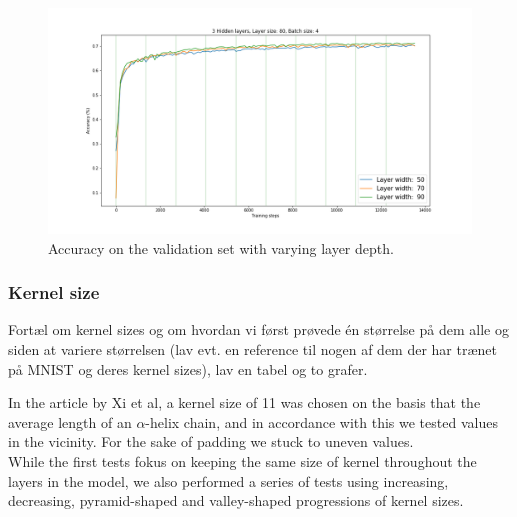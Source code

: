 \begin{figure}[H]
  \centering
  \includegraphics[width=\linewidth]{../graphs/new/layer_width_1}
  \caption{Accuracy on the validation set with varying layer depth.}
\end{figure}
\subsubsection{Kernel size}
Fortæl om kernel sizes og om hvordan vi først prøvede én størrelse på dem alle og siden at variere størrelsen (lav evt. en reference til nogen af dem der har trænet på MNIST og deres kernel sizes), lav en tabel og to grafer.

In the article by Xi et al, a kernel size of 11 was chosen on the basis that the average length of an $\alpha$-helix chain, and in accordance with this we tested values in the vicinity. For the sake of padding we stuck to uneven values.\\
While the first tests fokus on keeping the same size of kernel throughout the layers in the model, we also performed a series of tests using increasing, decreasing, pyramid-shaped and valley-shaped progressions of kernel sizes.

